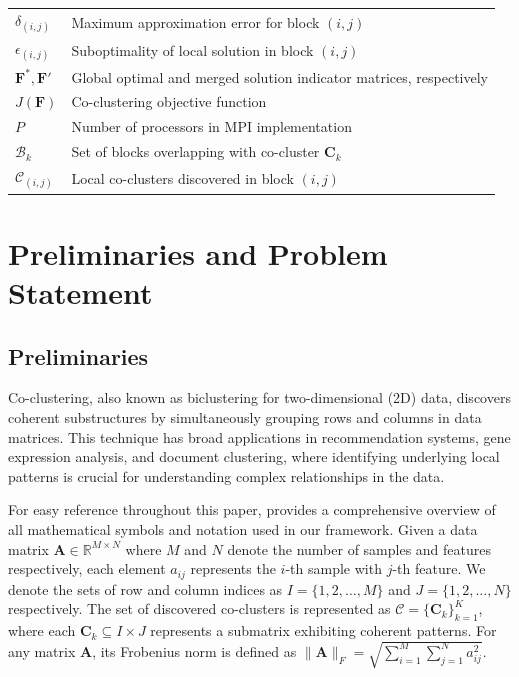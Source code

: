 \documentclass[journal]{IEEEtran}
\theoremstyle{definition}
\theoremstyle{remark} %
\begin{document}
{\begin{table}[htbp]
\begin{tabular}{@{} p{} p{} @{}}
                $\delta_{(i,j)}$                   & Maximum approximation error for block $(i,j)$                                   \\
                $\epsilon_{(i,j)}$                 & Suboptimality of local solution in block $(i,j)$                                \\
                $\mathbf{F}^*, \mathbf{F}'$        & Global optimal and merged solution indicator matrices, respectively                           \\
                $J(\mathbf{F})$                    & Co-clustering objective function                                                \\
                $P$                                & Number of processors in MPI implementation                                      \\
                $\mathcal{B}_k$                    & Set of blocks overlapping with co-cluster $\mathbf{C}_k$                        \\
                $\mathcal{C}_{(i,j)}$              & Local co-clusters discovered in block $(i,j)$                                   \\
                \bottomrule
            \end{tabular}
        \end{table}
    }

\section{Preliminaries and Problem Statement}
\label{sec:problem-formulation}
\subsection{Preliminaries}
Co-clustering, also known as biclustering for two-dimensional (2D) data, discovers coherent substructures by simultaneously grouping rows and columns in data matrices. This technique has broad applications in recommendation systems, gene expression analysis, and document clustering, where identifying underlying local patterns is crucial for understanding complex relationships in the data.

    {\color{blue} For easy reference throughout this paper,  provides a comprehensive overview of all mathematical symbols and notation used in our framework.} Given a data matrix $\mathbf{A} \in \mathbb{R}^{M \times N}$ where $M$ and $N$ denote the number of samples and features respectively, each element $a_{ij}$ represents the $i$-th sample with $j$-th feature. We denote the sets of row and column indices as $I = \{1,2,\ldots,M\}$ and $J = \{1,2,\ldots,N\}$ respectively. The set of discovered co-clusters is represented as $\mathcal{C} = \{\mathbf{C}_k\}_{k=1}^K$, where each $\mathbf{C}_k \subseteq I \times J$ represents a submatrix exhibiting coherent patterns. For any matrix $\mathbf{A}$, its Frobenius norm is defined as $\|\mathbf{A}\|_F = \sqrt{\sum_{i=1}^M \sum_{j=1}^N a_{ij}^2}$.
\end{document}
